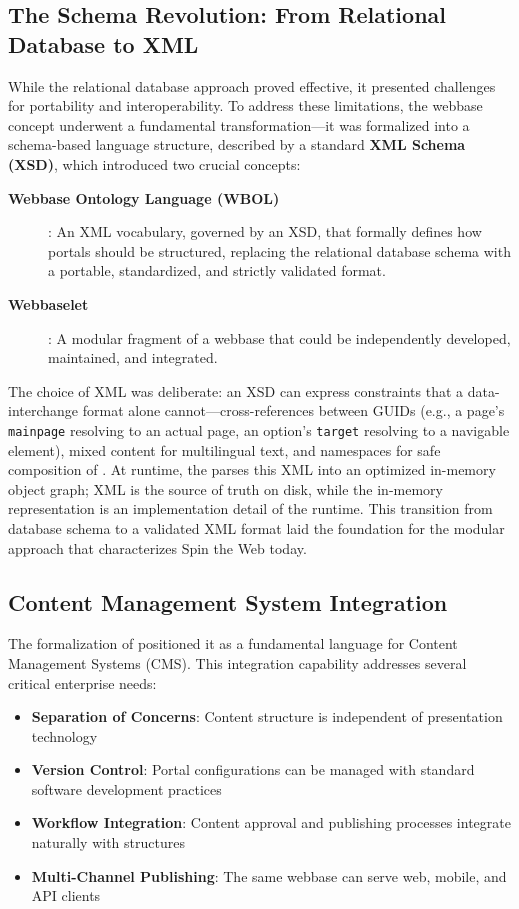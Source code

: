 \subsection{The Schema Revolution: From Relational Database to XML}

While the relational database approach proved effective, it presented challenges for portability and interoperability. To address these limitations, the webbase concept underwent a fundamental transformation—it was formalized into a schema-based language structure, described by a standard \textbf{XML Schema (XSD)}, which introduced two crucial concepts:

\begin{description}
\item[\textbf{Webbase Ontology Language (WBOL)}]: An XML vocabulary, governed by an XSD, that formally defines how portals should be structured, replacing the relational database schema with a portable, standardized, and strictly validated format.
\item[\textbf{Webbaselet}]: A modular fragment of a webbase that could be independently developed, maintained, and integrated.
\end{description}

The choice of XML was deliberate: an XSD can express constraints that a data-interchange format alone cannot—cross-references between GUIDs (e.g., a page's \texttt{mainpage} resolving to an actual page, an option's \texttt{target} resolving to a navigable element), mixed content for multilingual text, and namespaces for safe composition of . At runtime, the \webspinner{} parses this XML into an optimized in-memory object graph; XML is the source of truth on disk, while the in-memory representation is an implementation detail of the runtime. This transition from database schema to a validated XML format laid the foundation for the modular approach that characterizes Spin the Web today.

\subsection{Content Management System Integration}

The formalization of \wbol{} positioned it as a fundamental language for Content Management Systems (CMS). This integration capability addresses several critical enterprise needs:

\begin{itemize}
\item \textbf{Separation of Concerns}: Content structure is independent of presentation technology
\item \textbf{Version Control}: Portal configurations can be managed with standard software development practices
\item \textbf{Workflow Integration}: Content approval and publishing processes integrate naturally with \wbol{} structures
\item \textbf{Multi-Channel Publishing}: The same webbase can serve web, mobile, and API clients
\end{itemize}

